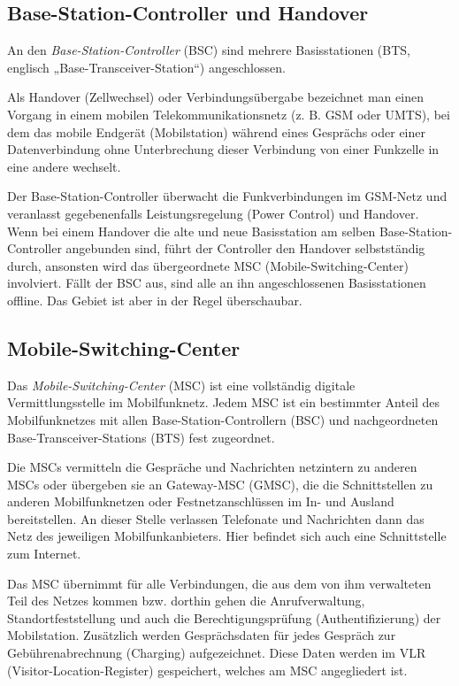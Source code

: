 \documentclass[loesung]{schulein}
\begin{document}
\subsection*{Base-Station-Controller und Handover}
An den \textit{Base-Station-Controller} (BSC) sind mehrere Basisstationen (BTS, englisch „Base-Transceiver-Station“) angeschlossen. 

Als Handover (Zellwechsel) oder Verbindungsübergabe bezeichnet man einen Vorgang in einem mobilen Telekommunikationsnetz (z. B. GSM oder UMTS), bei dem das mobile Endgerät (Mobilstation) während eines Gesprächs oder einer Datenverbindung ohne Unterbrechung dieser Verbindung von einer Funkzelle in eine andere wechselt.

Der Base-Station-Controller überwacht die Funkverbindungen im GSM-Netz und veranlasst gegebenenfalls Leistungsregelung (Power Control) und  Handover. Wenn bei einem Handover die alte und neue Basisstation am selben Base-Station-Controller angebunden sind, führt der Controller den Handover selbstständig durch, ansonsten wird das übergeordnete MSC (Mobile-Switching-Center) involviert. Fällt der BSC aus, sind alle an ihn angeschlossenen Basisstationen offline. Das Gebiet ist aber in der Regel überschaubar.

\subsection*{Mobile-Switching-Center}
Das \textit{Mobile-Switching-Center} (MSC) ist eine vollständig digitale Vermittlungsstelle im Mobilfunknetz. 
Jedem MSC ist ein bestimmter Anteil des Mobilfunknetzes mit allen Base-Station-Controllern (BSC) und nachgeordneten Base-Transceiver-Stations (BTS) fest zugeordnet.

Die MSCs vermitteln die Gespräche und Nachrichten netzintern zu anderen MSCs oder übergeben sie an Gateway-MSC (GMSC), die die Schnittstellen zu anderen Mobilfunknetzen oder Festnetzanschlüssen im In- und Ausland bereitstellen. An dieser Stelle verlassen Telefonate und Nachrichten dann das Netz des jeweiligen Mobilfunkanbieters. Hier befindet sich auch eine Schnittstelle zum Internet.

Das MSC übernimmt für alle Verbindungen, die aus dem von ihm verwalteten Teil des Netzes kommen bzw. dorthin gehen die Anrufverwaltung, Standortfeststellung und auch die Berechtigungsprüfung (Authentifizierung) der Mobilstation. Zusätzlich werden Gesprächsdaten für jedes Gespräch zur Gebührenabrechnung (Charging) aufgezeichnet. Diese Daten werden im VLR (Visitor-Location-Register) gespeichert, welches am MSC angegliedert ist.
\end{document}
